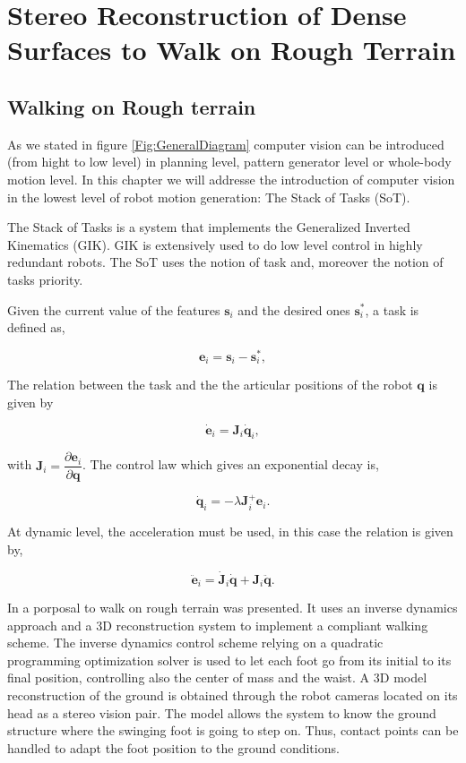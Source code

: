 \chapter{Stereo Reconstruction of Dense Surfaces to Walk on Rough Terrain} 
\label{Chap:3DReconstruction}

\section{Walking on Rough terrain}

As we stated in figure \ref{Fig:GeneralDiagram} computer vision can be introduced (from hight to low level) in planning level, pattern generator level or whole-body motion level. In this chapter we will addresse the introduction of computer vision in the lowest level of robot motion generation: The Stack of Tasks (SoT).

The Stack of Tasks is a system that implements the Generalized Inverted Kinematics (GIK). GIK is extensively used to do low level control in highly redundant robots. The SoT uses the notion of task and, moreover the notion of tasks priority. 

Given the current value of the features $\mathbf{s}_i$ and the desired ones $\mathbf{s}^{*}_i$, a task is defined as,

$$
\mathbf{e}_i = \mathbf{s}_i - \mathbf{s}^{*}_i,
$$

The relation between the task and the the articular positions of the robot $\mathbf{q}$ is given by

$$
\dot{\mathbf{e}}_i = \mathbf{J}_i \dot{\mathbf{q}}_i,
$$

with $\mathbf{J}_i = \dfrac{\partial \mathbf{e}_i}{\partial \mathbf{q}} $. The control law which gives an exponential decay is,

$$
\dot{\mathbf{q}}_i = - \lambda \mathbf{J}^{+}_i \mathbf{e}_i.
$$

At dynamic level, the acceleration must be used, in this case the relation is given by,

$$
\ddot{\mathbf{e}}_i = \dot{\mathbf{J}}_i \dot{\mathbf{q}} + \mathbf{J}_i \ddot{\mathbf{q}}.
$$

In \cite{} a porposal to walk on rough terrain was presented. It uses an inverse dynamics approach and a 3D reconstruction system to implement a compliant walking scheme. The inverse dynamics control scheme relying on a quadratic programming optimization solver is used to let each foot go from its initial to its final position, controlling also the center of mass and the waist. A 3D model reconstruction of the ground is obtained through the robot cameras located on its head as a stereo vision pair. The model allows the system to know the ground structure where the swinging foot is going to step on. Thus, contact points can be handled to adapt the foot position to the ground conditions.

